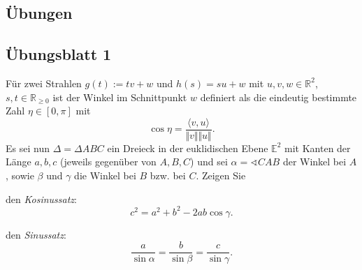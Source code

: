 \documentclass[11pt]{book}
\numberwithin{dummy}{section}
\theoremstyle{nonumberbreak}
\newenvironment{prob}[1][]{\ifthenelse{\equal{#1}{}}{\problem}{\problem[#1]}\rm}{\endproblem}
\newcommand{\E}{\mathbb{E}}
\newcommand{\R}{\mathbb{R}}
\begin{document}
\begin{spacing}{1.4}
\newpage

\thispagestyle{empty}









\chapter{Übungen} %

\setlength\abovedisplayshortskip{0pt}
\setlength\belowdisplayshortskip{10pt}
\setlength\abovedisplayskip{10pt}
\setlength\belowdisplayskip{10pt}

\thispagestyle{empty}
\setcounter{section}{0}





\titlespacing*{\section}{-16.5pt}{0pt}{20pt}
\renewcommand*\thesection{}
\section{Übungsblatt 1} %
\renewcommand*\thesection{\arabic{section}}


\hypertarget{Aeinseins}{}
\begin{prob}     %
Für zwei Strahlen $g(t):=tv+w$ und $h(s)=su+w$ mit $u,v,w \in \R^2$, $s,t \in \R_{\geqslant 0}$ ist der Winkel im Schnittpunkt $w$ definiert als die eindeutig bestimmte Zahl $\eta\in [0,\pi]$ mit 
$$\cos \eta = \frac{\langle v,u \rangle}{\Vert v \Vert \Vert u \Vert}.$$
Es sei nun $\Delta=\Delta ABC$ ein Dreieck in der euklidischen Ebene $\E^2$ mit Kanten der Länge $a,b,c$ (jeweils gegenüber von $A,B,C$) und sei $\alpha=\sphericalangle CAB$ der Winkel bei $A$, sowie $\beta$ und $\gamma$ die Winkel bei $B$ bzw. bei $C$. Zeigen Sie
\begin{compactenum}
\item den \textit{Kosinussatz}:
$$c^2=a^2+b^2-2ab \cos \gamma.$$
\item den \textit{Sinussatz}:
$$\frac{a}{\sin\alpha} = \frac{b}{\sin \beta} = \frac{c}{\sin \gamma}.$$
\end{compactenum}


\end{prob}
\end{spacing}
\end{document}
